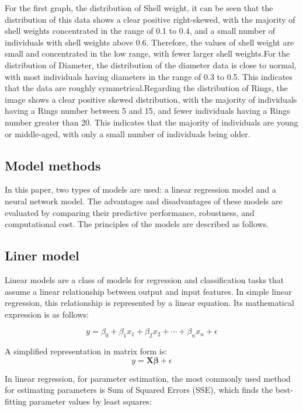 \documentclass[conference]{IEEEtran}
\begin{document}
For the first graph, the distribution of Shell weight, it can be seen that the distribution of this data shows a clear positive right-skewed, with the majority of shell weights concentrated in the range of 0.1 to 0.4, and a small number of individuals with shell weights above 0.6. Therefore, the values of shell weight are small and concentrated in the low range, with fewer larger shell weights.For the distribution of Diameter, the distribution of the diameter data is close to normal, with most individuals having diameters in the range of 0.3 to 0.5. This indicates that the data are roughly symmetrical.Regarding the distribution of Rings, the image shows a clear positive skewed distribution, with the majority of individuals having a Rings number between 5 and 15, and fewer individuals having a Rings number greater than 20. This indicates that the majority of individuals are young or middle-aged, with only a small number of individuals being older.

\subsection{Model methods}

In this paper, two types of models are used: a linear regression model and a neural network model. The advantages and disadvantages of these models are evaluated by comparing their predictive performance, robustness, and computational cost. The principles of the models are described as follows.

\subsection{Liner model}
Linear models are a class of models for regression and classification tasks that assume a linear relationship between output and input features. In simple linear regression, this relationship is represented by a linear equation. Its mathematical expression is as follows:

\begin{equation}
    y = \beta_0 + \beta_1 x_1 + \beta_2 x_2 + \cdots + \beta_n x_n + \epsilon
\end{equation}

A simplified representation in matrix form is:
\begin{equation}
    y = \mathbf{X} \boldsymbol{\beta} + \epsilon
\end{equation}

In linear regression, for parameter estimation, the most commonly used method for estimating parameters is Sum of Squared Errors (SSE), which finds the best-fitting parameter values by least squares:
\end{document}
